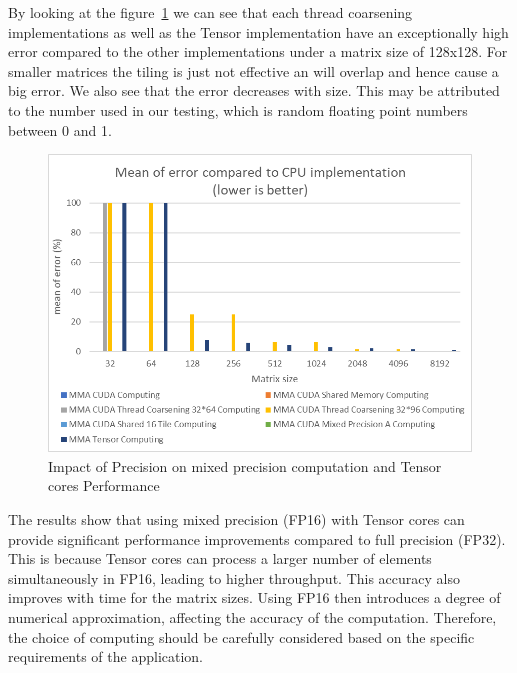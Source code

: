 \documentclass[conference]{IEEEtran}
\begin{document}
  By looking at the figure~\ref{fig:precision-impact} we can see that each thread coarsening implementations as well as the Tensor implementation
  have an exceptionally high error compared to the other implementations under a matrix size of 128x128.
  For smaller matrices the tiling is just not effective an will overlap and hence cause a big error. We also see that the error decreases with size.
  This may be attributed to the number used in our testing, which is random floating point numbers between 0 and 1. 
  \begin{figure}[htbp]
    \centering
    \includegraphics[scale=0.6]{figures/Mean of error compared to CPU 2.png}
    \caption{Impact of Precision on mixed precision computation and Tensor cores Performance}
    \label{fig:precision-impact}
  \end{figure}
  
  The results show that using mixed precision (FP16) with Tensor cores can provide significant performance improvements compared to full precision (FP32).
  This is because Tensor cores can process a larger number of elements simultaneously in FP16,
  leading to higher throughput. This accuracy also improves with time for the matrix sizes.
  Using FP16 then introduces a degree of numerical approximation, affecting the accuracy of the computation.
  Therefore, the choice of computing should be carefully considered based on the specific
  requirements of the application. 
  
  
\end{document}
